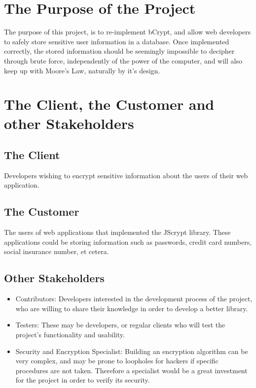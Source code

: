 \documentclass[12pt]{article}
\begin{document}
\section{The Purpose of the Project}
 
The purpose of this project, is to re-implement bCrypt, and allow web developers to safely store sensitive user information in a database. Once implemented correctly, the stored information should be seemingly impossible to decipher through brute force, independently of the power of the computer, and will also keep up with Moore’s Law, naturally by it’s design. 
 

\section{The Client, the Customer and other Stakeholders}

\subsection{The Client}
Developers wishing to encrypt sensitive information about the users of their web application.

\subsection{The Customer}
The users of web applications that implemented the JScrypt library. These applications could be storing information such as passwords, credit card numbers, social insurance number, et cetera.

\subsection{Other Stakeholders}
  \begin{itemize}

    \item Contributors: Developers interested in the development process of the project, who are willing to share their knowledge in order to develop a better library.
    \item Testers: These may be developers, or regular clients who will test the project’s functionality and usability.

    \item Security and Encryption Specialist: Building an encryption algorithm can be very complex, and may be prone to loopholes for hackers if specific procedures are not taken. Therefore a specialist would be a great investment for the project in order to verify its security. 
  \end{itemize}
\end{document}
